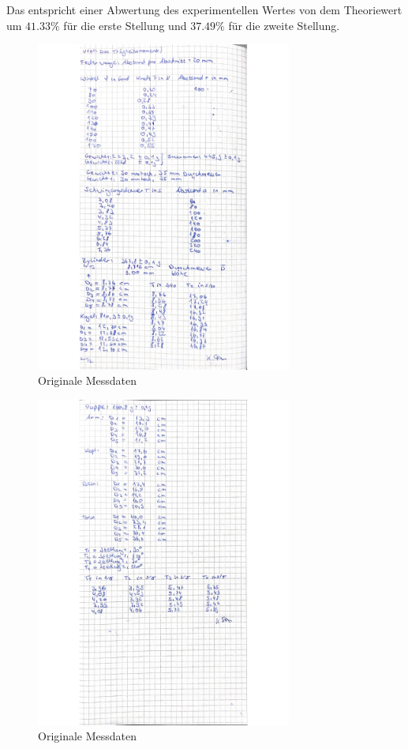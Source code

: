Das entspricht einer Abwertung des experimentellen Wertes von dem Theoriewert um $41.33 \%$ für die erste Stellung und
$37.49 \%$ für die zweite Stellung.

\newpage

\begin{figure}[H]
  \centering
  \includegraphics[width=0.75\textwidth]{Bilder/daten1.jpg}
  \caption{Originale Messdaten}
  \label{fig:daten1}
\end{figure}

\begin{figure}[H]
  \centering
  \includegraphics[width=0.75\textwidth]{Bilder/daten2.jpg}
  \caption{Originale Messdaten}
  \label{fig:daten2}
\end{figure}